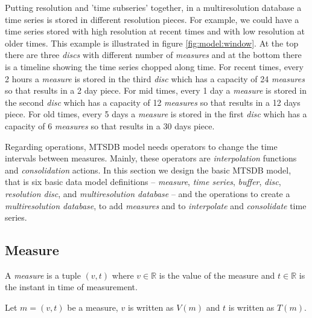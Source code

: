 Putting resolution and 'time subseries' together, in a multiresolution database a time series is stored in different resolution pieces. For example, we could have a time series stored with high resolution at recent times and with low resolution at older times. This example is illustrated in figure \ref{fig:model:window}. At the top there are three \emph{discs} with different number of \emph{measures} and at the bottom there is a timeline showing the time series chopped along time. For recent times, every 2 hours a \emph{measure} is stored in the third \emph{disc} which has a capacity of 24 \emph{measures} so that results in a 2 day piece. For mid times, every 1 day a  \emph{measure} is stored in the second \emph{disc} which has a capacity of 12 \emph{measures} so that results in a 12 days piece. For old times, every 5 days a  \emph{measure} is stored in the first \emph{disc} which has a capacity of 6 \emph{measures} so that results in a 30 days piece. 


Regarding operations, MTSDB model needs operators to change the time intervals between measures. Mainly, these operators are \emph{interpolation} functions and \emph{consolidation} actions. In this section we design the basic MTSDB model, that is six basic data model definitions -- \emph{measure}, \emph{time series}, \emph{buffer}, \emph{disc}, \emph{resolution disc}, and \emph{multiresolution database} -- and the operations to create a \emph{multiresolution database}, to add \emph{measures} and to \emph{interpolate} and \emph{consolidate} time series.



\subsection{Measure}

\begin{definition}[Measure]
  \label{def:measure}
  A \emph{measure} is a tuple $(v,t)$ where $v\in{\mathbb{R}}$ is the
  value of the measure and $t \in \mathbb{R}$ is the instant in time
  of measurement.
\end{definition}

Let $m=(v,t)$ be a measure, $v$ is written as $V(m)$ and $t$
is written as $T(m)$.

